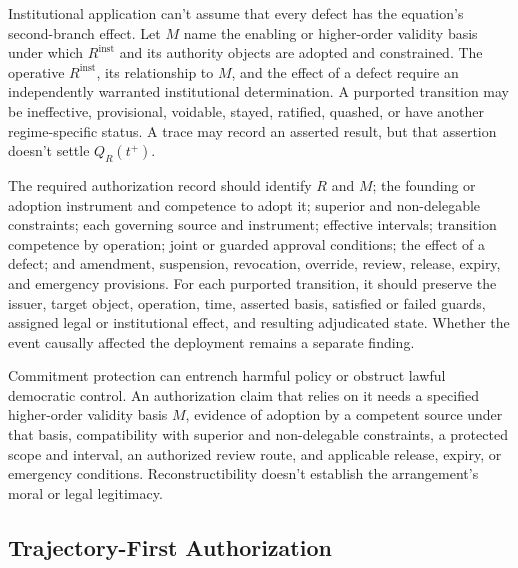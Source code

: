 Institutional application can't assume that every defect has the equation's second-branch effect. Let \(M\) name the enabling or higher-order validity basis under which \(R^{\mathrm{inst}}\) and its authority objects are adopted and constrained. The operative \(R^{\mathrm{inst}}\), its relationship to \(M\), and the effect of a defect require an independently warranted institutional determination. A purported transition may be ineffective, provisional, voidable, stayed, ratified, quashed, or have another regime-specific status. A trace may record an asserted result, but that assertion doesn't settle \(Q_R(t^{+})\).

The required authorization record should identify \(R\) and \(M\); the founding or adoption instrument and competence to adopt it; superior and non-delegable constraints; each governing source and instrument; effective intervals; transition competence by operation; joint or guarded approval conditions; the effect of a defect; and amendment, suspension, revocation, override, review, release, expiry, and emergency provisions. For each purported transition, it should preserve the issuer, target object, operation, time, asserted basis, satisfied or failed guards, assigned legal or institutional effect, and resulting adjudicated state. Whether the event causally affected the deployment remains a separate finding.

Commitment protection can entrench harmful policy or obstruct lawful democratic control. An authorization claim that relies on it needs a specified higher-order validity basis \(M\), evidence of adoption by a competent source under that basis, compatibility with superior and non-delegable constraints, a protected scope and interval, an authorized review route, and applicable release, expiry, or emergency conditions. Reconstructibility doesn't establish the arrangement's moral or legal legitimacy.

\subsection{Trajectory-First Authorization}
\label{sec:trajectory-first}
\label{sec:trajectory-core}

